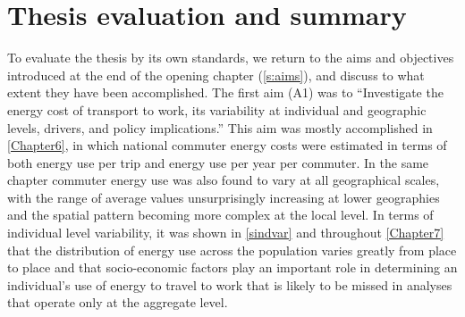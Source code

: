 \documentclass[a4paper, 11pt, twoside]{Thesis}
\begin{document}
\section{Thesis evaluation and summary} \label{ssummary}
To evaluate the thesis by its own standards, we return to the aims and
objectives introduced at the end of the opening chapter (\cref{s:aims}), and
discuss to what extent they have been accomplished.  The first aim (A1) was to
``Investigate the energy cost of transport to work, its variability
at individual and geographic levels, drivers, and policy implications.'' This
aim was mostly accomplished in \cref{Chapter6}, in which national commuter
energy costs were estimated in terms of both energy use per trip and energy use
per year per commuter. In the same chapter commuter energy use was also found
to vary at all geographical scales, with the range of average values
unsurprisingly increasing at lower geographies and the spatial pattern becoming
more complex at the local level. In terms of individual level variability, it
was shown in \cref{sindvar} and throughout \cref{Chapter7} that the distribution
of energy use across the population varies greatly from place to place and that
socio-economic factors play an important role in determining an individual's
use of energy to travel to work that is likely to be missed in analyses that
operate only at the aggregate level. 
\end{document}
